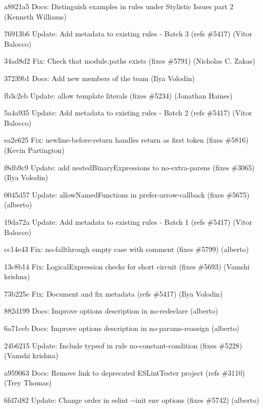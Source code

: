\begin{DoxyItemize}
\item a8821a5 Docs\+: Distinguish examples in rules under Stylistic Issues part 2 (Kenneth Williams)
\item 76913b6 Update\+: Add metadata to existing rules -\/ Batch 3 (refs \#5417) (Vitor Balocco)
\item 34ad8d2 Fix\+: Check that module.\+paths exists (fixes \#5791) (Nicholas C. Zakas)
\item 37239b1 Docs\+: Add new members of the team (Ilya Volodin)
\item fb3c2eb Update\+: allow template literals (fixes \#5234) (Jonathan Haines)
\item 5a4a935 Update\+: Add metadata to existing rules -\/ Batch 2 (refs \#5417) (Vitor Balocco)
\item ea2e625 Fix\+: newline-\/before-\/return handles return as first token (fixes \#5816) (Kevin Partington)
\item f8db9c9 Update\+: add nested\+Binary\+Expressions to no-\/extra-\/parens (fixes \#3065) (Ilya Volodin)
\item 0045d57 Update\+: {\ttfamily allow\+Named\+Functions} in {\ttfamily prefer-\/arrow-\/callback} (fixes \#5675) (alberto)
\item 19da72a Update\+: Add metadata to existing rules -\/ Batch 1 (refs \#5417) (Vitor Balocco)
\item cc14e43 Fix\+: {\ttfamily no-\/fallthrough} empty case with comment (fixes \#5799) (alberto)
\item 13c8b14 Fix\+: Logical\+Expression checks for short circuit (fixes \#5693) (Vamshi krishna)
\item 73b225e Fix\+: Document and fix metadata (refs \#5417) (Ilya Volodin)
\item 882d199 Docs\+: Improve options description in {\ttfamily no-\/redeclare} (alberto)
\item 6a71ceb Docs\+: Improve options description in {\ttfamily no-\/params-\/reassign} (alberto)
\item 24b6215 Update\+: Include \textquotesingle{}typeof\textquotesingle{} in rule \textquotesingle{}no-\/constant-\/condition\textquotesingle{} (fixes \#5228) (Vamshi krishna)
\item a959063 Docs\+: Remove link to deprecated E\+S\+Lint\+Tester project (refs \#3110) (Trey Thomas)
\item 6fd7d82 Update\+: Change order in {\ttfamily eslint -\/-\/init} env options (fixes \#5742) (alberto)

\end{DoxyItemize}
